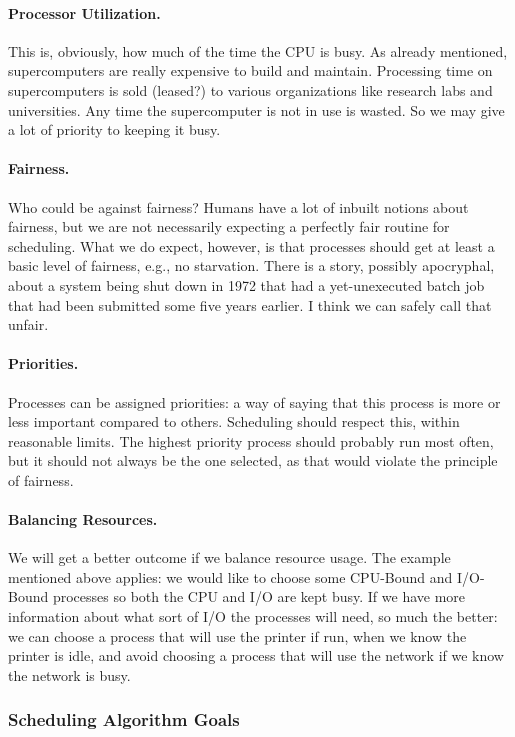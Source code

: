 \paragraph{Processor Utilization.} This is, obviously, how much of the time the CPU is busy. As already mentioned, supercomputers are really expensive to build and maintain. Processing time on supercomputers is sold (leased?) to various organizations like research labs and universities. Any time the supercomputer is not in use is wasted. So we may give a lot of priority to keeping it busy.

\paragraph{Fairness.} Who could be against fairness? Humans have a lot of inbuilt notions about fairness, but we are not necessarily expecting a perfectly fair routine for scheduling. What we do expect, however, is that processes should get at least a basic level of fairness, e.g., no starvation. There is a story, possibly apocryphal, about a system being shut down in 1972 that had a yet-unexecuted batch job that had been submitted some five years earlier. I think we can safely call that unfair.

\paragraph{Priorities.} Processes can be assigned priorities: a way of saying that this process is more or less important compared to others. Scheduling should respect this, within reasonable limits. The highest priority process should probably run most often, but it should not always be the one selected, as that would violate the principle of fairness.

\paragraph{Balancing Resources.} We will get a better outcome if we balance resource usage. The example mentioned above applies: we would like to choose some CPU-Bound and I/O-Bound processes so both the CPU and I/O are kept busy. If we have more information about what sort of I/O the processes will need, so much the better: we can choose a process that will use the printer if run, when we know the printer is idle, and avoid choosing a process that will use the network if we know the network is busy.

\subsubsection*{Scheduling Algorithm Goals}

